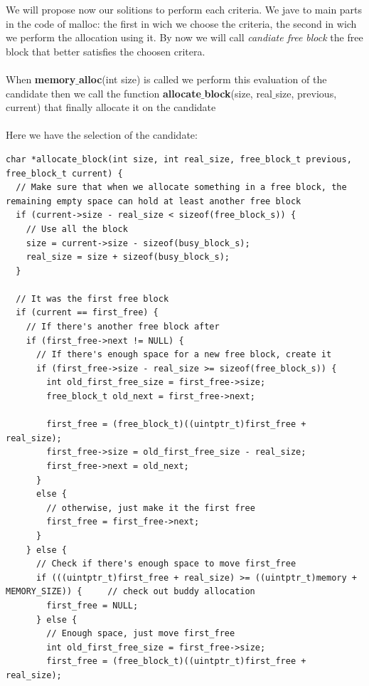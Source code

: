 \documentclass[11pt]{article}
\begin{document}
We will propose now our solitions to perform each criteria. We jave to main parts in the code of malloc: the first in wich we choose the criteria, the second in wich we perform the allocation using it. By now we will call \textit{candiate free block} the free block that better satisfies the choosen critera.\\
\\
When \textbf{memory$\_$alloc}(int size) is called we perform this evaluation of the candidate then we call the function \textbf{allocate$\_$block}(size, real$\_$size, previous, current) that finally allocate it on the candidate\\
\\
Here we have the selection of the candidate:
\begin{lstlisting}
char *allocate_block(int size, int real_size, free_block_t previous, free_block_t current) {
  // Make sure that when we allocate something in a free block, the remaining empty space can hold at least another free block
  if (current->size - real_size < sizeof(free_block_s)) {
    // Use all the block
    size = current->size - sizeof(busy_block_s);
    real_size = size + sizeof(busy_block_s);
  }

  // It was the first free block
  if (current == first_free) {
    // If there's another free block after
    if (first_free->next != NULL) {
      // If there's enough space for a new free block, create it
      if (first_free->size - real_size >= sizeof(free_block_s)) {
        int old_first_free_size = first_free->size;
        free_block_t old_next = first_free->next;

        first_free = (free_block_t)((uintptr_t)first_free + real_size);
        first_free->size = old_first_free_size - real_size; 
        first_free->next = old_next;
      }
      else {
        // otherwise, just make it the first free
        first_free = first_free->next;
      }
    } else {
      // Check if there's enough space to move first_free                              
      if (((uintptr_t)first_free + real_size) >= ((uintptr_t)memory + MEMORY_SIZE)) {     // check out buddy allocation
        first_free = NULL;
      } else {
        // Enough space, just move first_free 
        int old_first_free_size = first_free->size;
        first_free = (free_block_t)((uintptr_t)first_free + real_size);


\end{lstlisting}
\end{document}

